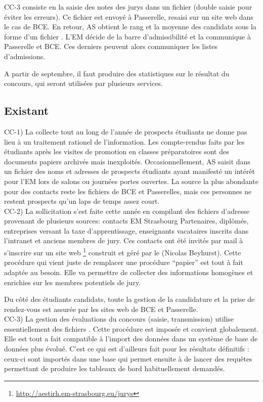 \documentclass{book}
\begin{document}
CC-3 consiste en la saisie des notes des jurys dans un fichier
 (double saisie pour éviter les erreurs). Ce fichier est 
envoyé à Passerelle, resaisi sur un site web dans le cas de BCE.
En retour, AS obtient le rang et la moyenne des candidats sous
la forme d'un fichier . L'EM décide de la barre d'admissibilité
et la communique à Passerelle et BCE. Ces derniers peuvent alors
communiquer les listes d'admissions.

A partir de septembre, il faut produire des statistiques sur le
résultat du concours, qui seront utilisées par plusieurs services.


\subsection{Existant}
CC-1) 
La collecte tout au long de l'année de prospects étudiants
ne donne pas lieu à un traitement rationel de l'information.
Les compte-rendus faits par les étudiants après les visites de
promotion en classes préparatoires sont des documents papiers
archivés mais inexploités. Occasionnellement, AS saisit dans un
fichier  des noms et adresses de prospects étudiants ayant 
manifesté un intérêt pour l'EM lors de salons ou journées portes 
ouvertes. La source la plus abondante pour des contacts reste
les fichiers de BCE et Passerelles, mais ces personnes ne restent
prospects qu'un laps de temps assez court.\\


CC-2)
La sollicitation s'est faite cette année en compilant des
fichiers d'adresse provenant de plusieurs sources: contacts
EM Strasbourg Partenaires, diplômés, entreprises versant la
taxe d'apprentissage, enseignants vacataires inscrits dans
l'intranet et anciens membres de jury. Ces contacts ont été
invités par mail à s'inscrire sur un site web%
\footnote{\url{http://aestirh.em-strasbourg.eu/jurys}}
construit et géré par le \scom (Nicolas Beyhurst).
Cette procédure qui vient juste de remplacer une procédure
``papier'' est tout à fait adaptée au besoin. Elle va permettre
de collecter des informations homogènes et enrichies sur les
membres potentiels de jury.

Du côté des étudiants candidats, toute la gestion de la 
candidature et la prise de rendez-vous est assurée par 
les sites web de BCE et Passerelle.\\

CC-3) 
La gestion des évaluations du concours (saisie, transmission)
utilise essentiellement des fichiers . Cette procédure
est imposée et convient globalement. Elle est tout a fait 
compatible à l'import des données dans un système de base de
données plus évolué.
C'est ce qui est d'ailleurs fait pour les résultats définitifs :
ceux-ci sont importés dans une base  qui permet ensuite
à \CK de lancer des requêtes permettant de produire les tableaux
de bord habituellement demandés. 
\end{document}
